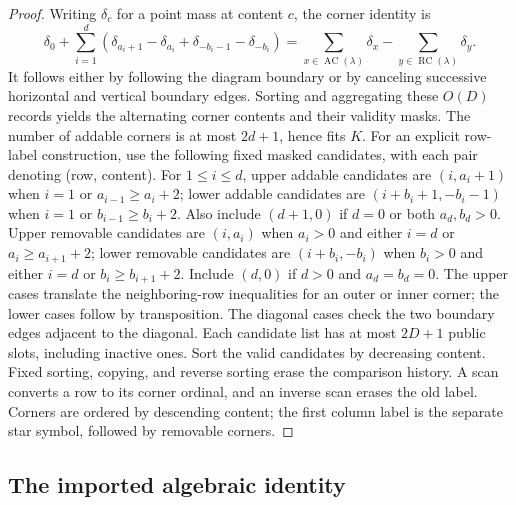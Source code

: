 \documentclass[11pt]{article}
\theoremstyle{definition}
\newcommand{\AC}{\operatorname{AC}}
\newcommand{\RC}{\operatorname{RC}}
\begin{document}
\begin{proof}
Writing $\delta_c$ for a point mass at content $c$, the corner identity is
\[
 \delta_0+\sum_{i=1}^{d}
 (\delta_{a_i+1}-\delta_{a_i}+\delta_{-b_i-1}-\delta_{-b_i})
 =\sum_{x\in\AC(\lambda)}\delta_x-
   \sum_{y\in\RC(\lambda)}\delta_y.
\]
It follows either by following the diagram boundary or by canceling
successive horizontal and vertical boundary edges. Sorting and aggregating
these $O(D)$ records yields the alternating corner contents and their
validity masks. The number of addable corners is at most $2d+1$, hence
fits $K$. For an explicit row-label construction, use the following
fixed masked candidates, with each pair denoting (row, content).
For $1\le i\le d$, upper addable candidates are $(i,a_i+1)$ when
$i=1$ or $a_{i-1}\ge a_i+2$; lower addable candidates are
$(i+b_i+1,-b_i-1)$ when $i=1$ or $b_{i-1}\ge b_i+2$.
Also include $(d+1,0)$ if $d=0$ or both $a_d,b_d>0$.
Upper removable candidates are $(i,a_i)$ when $a_i>0$ and
either $i=d$ or $a_i\ge a_{i+1}+2$; lower removable candidates are
$(i+b_i,-b_i)$ when $b_i>0$ and either $i=d$ or
$b_i\ge b_{i+1}+2$. Include $(d,0)$ if $d>0$ and $a_d=b_d=0$.
The upper cases translate the neighboring-row inequalities for an outer
or inner corner; the lower cases follow by transposition. The diagonal
cases check the two boundary edges adjacent to the diagonal.
Each candidate list has at most $2D+1$ public slots, including inactive
ones. Sort the valid candidates by decreasing content.
Fixed sorting, copying, and reverse sorting erase the comparison history.
A scan converts a row to its corner ordinal, and an inverse scan erases
the old label. Corners are ordered by descending content; the first
column label is the separate star symbol, followed by removable corners.
\end{proof}

\subsection{The imported algebraic identity}
\end{document}
